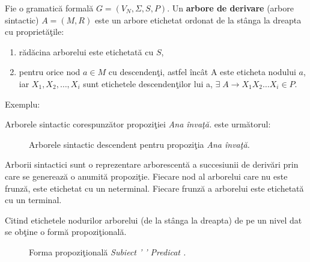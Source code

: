 \begin{definitie}
Fie o gramatică formală $G = (V_{N}, \Sigma, S, P )$. Un \textbf{arbore de derivare} (arbore sintactic) $A=(M, R)$ este un arbore etichetat ordonat de la stânga la dreapta cu proprietăţile:
\begin{enumerate}
\item
rădăcina arborelui este etichetată cu $S$,
\item
pentru orice nod $a \in M$ cu descendenţi, astfel încât A este eticheta nodului $a$, iar $X_{1}, X_{2}, \dots, X_{i}$ sunt etichetele descendenţilor lui a, $\exists \; A \rightarrow X_{1} X_{2} \dots X_{i} \in P$.
\end{enumerate}
\end{definitie}

Exemplu:

Arborele sintactic corespunzător propoziţiei \textit{Ana învaţă.} este următorul:

\begin{figure}[H]
\centering
{}
\caption{Arborele sintactic descendent pentru propoziţia \textit{Ana învaţă.}}
\end{figure}

Arborii sintactici sunt o reprezentare arborescentă a succesiunii de derivări prin care se generează o anumită propoziţie. Fiecare nod al arborelui care nu este frunză, este etichetat cu un neterminal. Fiecare frunză a arborelui este etichetată cu un terminal. 

Citind etichetele nodurilor arborelui (de la stânga la dreapta) de pe un nivel dat se obţine o formă propoziţională. 

\begin{figure}[H]
\centering
{}
\caption{Forma propoziţională \textit{Subiect ' ' Predicat .}}
\end{figure}

